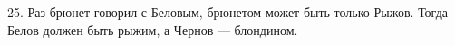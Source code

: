 25. Раз брюнет говорил с Беловым, брюнетом может быть только Рыжов. Тогда Белов должен быть рыжим, а Чернов --- блондином.\\
